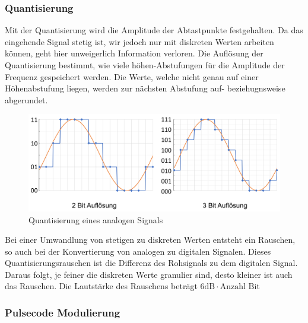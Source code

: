 \documentclass{article}
\begin{document}
\subsubsection{Quantisierung}
Mit der Quantisierung wird die Amplitude der Abtastpunkte festgehalten. Da das eingehende Signal stetig ist, wir jedoch nur mit diskreten Werten arbeiten können, geht hier unweigerlich Information verloren. Die Auflösung der Quantisierung bestimmt, wie viele höhen-Abstufungen für die Amplitude der Frequenz gespeichert werden. Die Werte, welche nicht genau auf einer Höhenabstufung liegen, werden zur nächsten Abstufung auf- beziehugnsweise abgerundet.
\begin{figure}[h]
		\includegraphics[width=\linewidth]{img/audioQuantisierung.png}
		\caption{Quantisierung eines analogen Signals}
		\label{fig:Quantisierung eines analogen Signals}
\end{figure}
\newline
Bei einer Umwandlung von stetigen zu diskreten Werten entsteht ein Rauschen, so auch bei der Konvertierung von analogen zu digitalen Signalen. Dieses Quantisierungsrauschen ist die Differenz des Rohsignals zu dem digitalen Signal. Daraus folgt, je feiner die diskreten Werte granulier sind, desto kleiner ist auch das Rauschen. Die Lautstärke des Rauschens beträgt $6\textrm{dB} \cdot \textrm{Anzahl Bit}$
\subsubsection{Pulsecode Modulierung}
\end{document}
